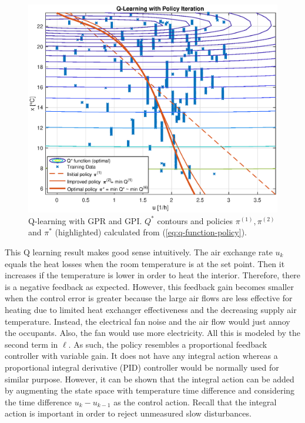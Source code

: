 \documentclass{ifacconf}
\begin{document}
\begin{figure}
\centering{}\includegraphics[width=0.95\columnwidth]{figures/q_learning_improved}
\caption{\label{fig:Q-Learning-with-Gaussian}Q-learning with GPR and GPI.
$Q^{*}$ contours and policies $\pi^{(1)},\pi^{(2)}$ and $\pi^{*}$
(highlighted) calculated from (\ref{eq:q-function-policy}).}
\end{figure}
This Q learning result makes good sense intuitively. The air exchange
rate $u_{k}$ equals the heat losses when the room temperature is
at the set point. Then it increases if the temperature is lower in
order to heat the interior. Therefore, there is a negative feedback
as expected. However, this feedback gain becomes smaller when the
control error is greater because the large air flows are less effective
for heating due to limited heat exchanger effectiveness and the decreasing
supply air temperature. Instead, the electrical fan noise and the
air flow would just annoy the occupants. Also, the fan would use more
electricity. All this is modeled by the second term in $\ell$. As
such, the policy resembles a proportional feedback controller with
variable gain. It does not have any integral action whereas a proportional
integral derivative (PID) controller would be normally used for similar
purpose. However, it can be shown that the integral action can be
added by augmenting the state space with temperature time difference
and considering the time difference $u_{k}-u_{k-1}$ as the control
action. Recall that the integral action is important in order to reject
unmeasured slow disturbances.
\end{document}
